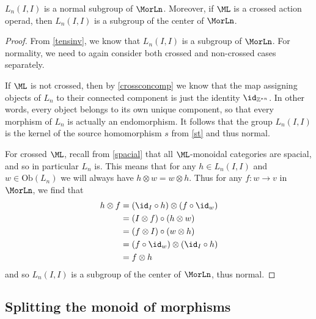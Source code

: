 \begin{prop} \label{endnorm} $L_n(I,I)$ is a normal subgroup of $\MorLn$. Moreover, if $\ML$ is a crossed action operad, then $L_n(I,I)$ is a subgroup of the center of $\MorLn$.
\end{prop}
\begin{proof}
From \cref{tensinv}, we know that $L_n(I,I)$ is a subgroup of $\MorLn$. For normality, we need to again consider both crossed and non-crossed cases separately. 

If $\ML$ is not crossed, then by \cref{crossconcomp} we know that the map assigning objects of $L_n$ to their connected component is just the identity $\id_{\mathbb{Z}^{\ast n}}$. In other words, every object belongs to its own unique component, so that every morphism of $L_n$ is actually an endomorphism. It follows that the group $L_n(I,I)$ is the kernel of the source homomorphism $s$ from \cref{st} and thus normal.

For crossed $\ML$, recall from \cref{spacial} that all $\ML$-monoidal categories are spacial, and so in particular $L_n$ is. This means that for any $h \in L_n(I,I)$ and $w \in \mathrm{Ob}(L_n)$ we will always have $h \otimes w = w \otimes h$. Thus for any $f \colon w \rightarrow v$ in $\MorLn$, we find that
  \begin{align*}
  	h \otimes f & =(\id_I \circ h) \otimes (f \circ \id_w) \\
  	&= (I \otimes f) \circ (h \otimes w) \\
  	&= (f \otimes I) \circ (w \otimes h) \\
  	&= (f \circ \id_w) \otimes (\id_I \circ h) \\
  	&= f \otimes h
  \end{align*}
and so $L_n(I,I)$ is a subgroup of the center of $\MorLn$, thus normal. 
\end{proof}

\subsection{Splitting the monoid of morphisms}

